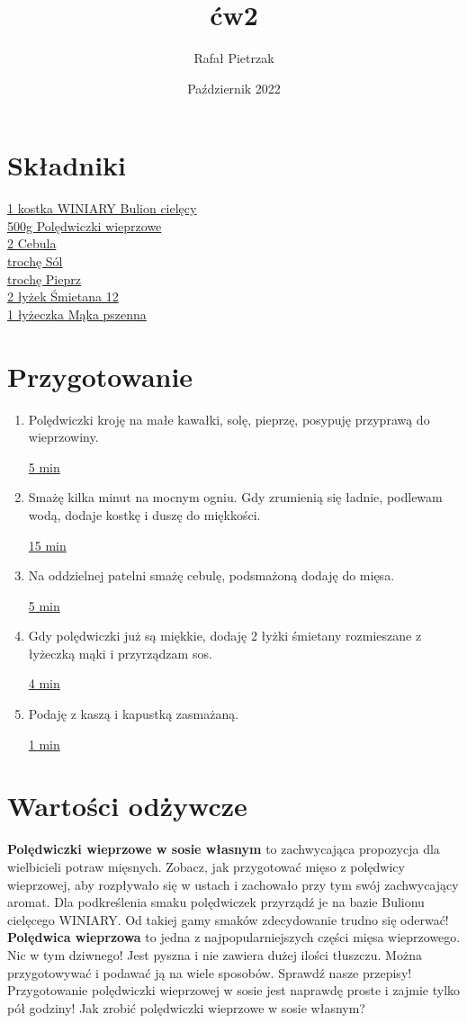 \documentclass[12pt, letterpaper, titlepage]{article}
\title{\Huge ćw2}
\author{\huge Rafał Pietrzak}
\date{Październik 2022}
\begin{document}
\maketitle
\section{\textbf{Składniki}}

\underline{1 kostka   WINIARY Bulion cielęcy} \\
\underline{500g       Polędwiczki wieprzowe} \\
\underline{2          Cebula} \\
\underline{trochę     Sól} \\
\underline{trochę     Pieprz} \\
\underline{2 łyżek    Śmietana 12} \\ 
\underline{1 łyżeczka Mąka pszenna} 

\section{\textbf{Przygotowanie}}
\begin{enumerate}

\item Polędwiczki kroję na małe kawałki, solę, pieprzę, posypuję przyprawą do wieprzowiny. 

\underline{5 min}
\item Smażę kilka minut na mocnym ogniu. Gdy zrumienią się ładnie, podlewam wodą, dodaje kostkę i duszę do miękkości.

\underline{15 min}
\item Na oddzielnej patelni smażę cebulę, podsmażoną dodaję do mięsa.

\underline{5 min}
\item Gdy polędwiczki już są miękkie, dodaję 2 łyżki śmietany rozmieszane z łyżeczką mąki i przyrządzam sos.

\underline{4 min}
\item Podaję z kaszą i kapustką zasmażaną.

\underline{1 min}
\end{enumerate}
\section{\textbf{Wartości odżywcze}}

\textbf{Polędwiczki wieprzowe w sosie własnym} to zachwycająca propozycja dla wielbicieli potraw mięsnych. Zobacz, jak przygotować mięso z polędwicy wieprzowej, aby rozpływało się w ustach i zachowało przy tym swój zachwycający aromat. Dla podkreślenia smaku polędwiczek przyrządź je na bazie Bulionu cielęcego WINIARY. Od takiej gamy smaków zdecydowanie trudno się oderwać!\\

\textbf{Polędwica wieprzowa} to jedna z najpopularniejszych części mięsa wieprzowego. Nic w tym dziwnego! Jest pyszna i nie zawiera dużej ilości tłuszczu. Można przygotowywać i podawać ją na wiele sposobów. Sprawdź nasze przepisy! Przygotowanie polędwiczki wieprzowej w sosie jest naprawdę proste i zajmie tylko pół godziny! Jak zrobić polędwiczki wieprzowe w sosie własnym?\\
\end{document}
